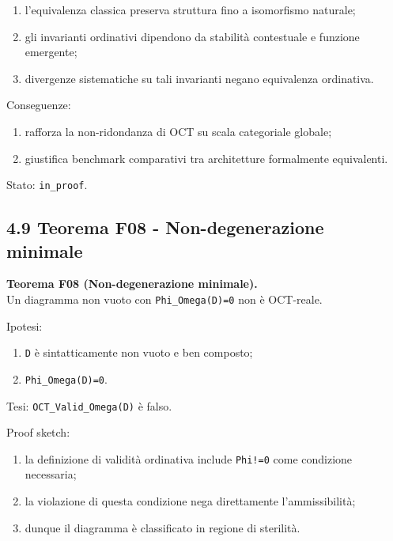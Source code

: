 \begin{enumerate}
\def\labelenumi{\arabic{enumi}.}
\tightlist
\item
  l'equivalenza classica preserva struttura fino a isomorfismo naturale;
\item
  gli invarianti ordinativi dipendono da stabilità contestuale e funzione emergente;
\item
  divergenze sistematiche su tali invarianti negano equivalenza ordinativa.
\end{enumerate}

Conseguenze:

\begin{enumerate}
\def\labelenumi{\arabic{enumi}.}
\tightlist
\item
  rafforza la non-ridondanza di OCT su scala categoriale globale;
\item
  giustifica benchmark comparativi tra architetture formalmente equivalenti.
\end{enumerate}

Stato: \texttt{in\_proof}.

\subsection{4.9 Teorema F08 - Non-degenerazione minimale}

\textbf{Teorema F08 (Non-degenerazione minimale).}\\
Un diagramma non vuoto con \texttt{Phi\_Omega(D)=0} non è OCT-reale.

Ipotesi:

\begin{enumerate}
\def\labelenumi{\arabic{enumi}.}
\tightlist
\item
  \texttt{D} è sintatticamente non vuoto e ben composto;
\item
  \texttt{Phi\_Omega(D)=0}.
\end{enumerate}

Tesi:
\texttt{OCT\_Valid\_Omega(D)} è falso.

Proof sketch:

\begin{enumerate}
\def\labelenumi{\arabic{enumi}.}
\tightlist
\item
  la definizione di validità ordinativa include \texttt{Phi!=0} come condizione necessaria;
\item
  la violazione di questa condizione nega direttamente l'ammissibilità;
\item
  dunque il diagramma è classificato in regione di sterilità.
\end{enumerate}


